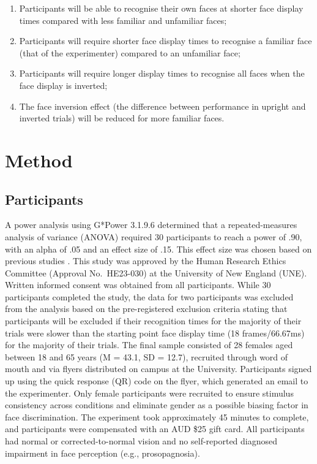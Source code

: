 \documentclass[
  authoryear,
  review,
  3p,
  onecolumn]{elsarticle}
\begin{document}
\begin{enumerate}
\def\labelenumi{\arabic{enumi}.}
\item
  Participants will be able to recognise their own faces at shorter face
  display times compared with less familiar and unfamiliar faces;
\item
  Participants will require shorter face display times to recognise a
  familiar face (that of the experimenter) compared to an unfamiliar
  face;
\item
  Participants will require longer display times to recognise all faces
  when the face display is inverted;
\item
  The face inversion effect (the difference between performance in
  upright and inverted trials) will be reduced for more familiar faces.
\end{enumerate}

\section{Method}\label{method}

\subsection{Participants}\label{participants}

A power analysis using G*Power 3.1.9.6 \citep{faul2009a} determined that
a repeated-measures analysis of variance (ANOVA) required 30
participants to reach a power of .90, with an alpha of .05 and an effect
size of .15. This effect size was chosen based on previous studies
\citep{campbell2021a, zimmermann2019a}. This study was approved by the
Human Research Ethics Committee (Approval No.~HE23-030) at the
University of New England (UNE). Written informed consent was obtained
from all participants. While 30 participants completed the study, the
data for two participants was excluded from the analysis based on the
pre-registered exclusion criteria stating that participants will be
excluded if their recognition times for the majority of their trials
were slower than the starting point face display time (18
frames/66.67ms) for the majority of their trials. The final sample
consisted of 28 females aged between 18 and 65 years (M = 43.1, SD =
12.7), recruited through word of mouth and via flyers distributed on
campus at the University. Participants signed up using the quick
response (QR) code on the flyer, which generated an email to the
experimenter. Only female participants were recruited to ensure stimulus
consistency across conditions and eliminate gender as a possible biasing
factor in face discrimination. The experiment took approximately 45
minutes to complete, and participants were compensated with an AUD \$25
gift card. All participants had normal or corrected-to-normal vision and
no self-reported diagnosed impairment in face perception (e.g.,
prosopagnosia).
\end{document}
